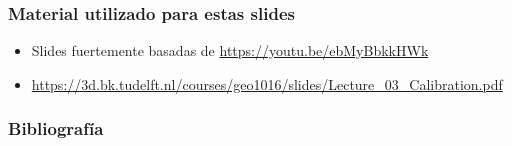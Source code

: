 \begin{frame}
    \frametitle{Material utilizado para estas slides}
    
    \footnotesize
    \begin{itemize}
        \item Slides fuertemente basadas de \url{https://youtu.be/ebMyBbkkHWk}
        \item \url{https://3d.bk.tudelft.nl/courses/geo1016/slides/Lecture_03_Calibration.pdf}
    \end{itemize}
    
\end{frame}

\begin{frame}
	\frametitle{Bibliografía}
	\nocite{hartley2003multiple}
	
	\printbibliography
	
\end{frame}